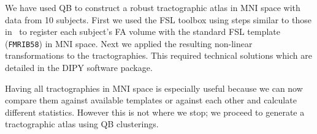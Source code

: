 \documentclass{bioinfo}
\begin{document}
We have used QB to construct a robust tractographic atlas in MNI space
with data from 10 subjects. First we used the FSL toolbox using steps
similar to those in~\citet{Smith2006NeuroImage} to register each
subject's FA volume with the standard FSL template (\texttt{FMRIB58}) in
MNI space. Next we applied the resulting non-linear transformations to
the tractographies. This required technical solutions which are detailed
in the DIPY software package.

Having all tractographies in MNI space is especially useful because we
can now compare them against available templates or against each other
and calculate different statistics. However this is not where we stop;
we proceed to generate a tractographic atlas using QB clusterings.

\end{document}
